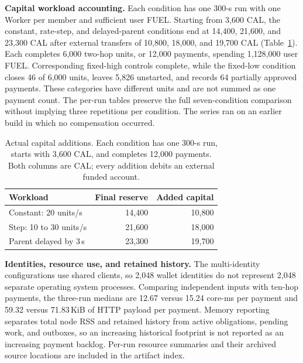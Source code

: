 \noindent\textbf{Capital workload accounting.}
Each condition has one 300-s run with one Worker per member and sufficient
user FUEL. Starting from 3,600 CAL, the constant, rate-step, and
delayed-parent conditions end at 14,400, 21,600, and 23,300 CAL after external
transfers of 10,800, 18,000, and 19,700 CAL
(Table~\ref{tab:eval-capital}). Each completes 6,000 two-hop units, or 12,000
payments, spending 1,128,000 user FUEL. Corresponding fixed-high controls
complete, while the fixed-low condition closes 46 of 6,000 units, leaves 5,826
unstarted, and records 64 partially approved payments. These categories have
different units and are not summed as one payment count. The per-run tables
preserve the full seven-condition comparison without implying three
repetitions per condition. The series ran on an earlier build in which no
compensation occurred.

\begin{table}[t]
  \caption{Actual capital additions. Each condition has one 300-s run,
    starts with 3,600 CAL, and completes 12,000 payments. Both columns
    are CAL; every addition debits an external funded account.}
  \label{tab:eval-capital}
  \centering
  \small
  \begin{tabular}{@{}lrr@{}}
    \toprule
    Workload & Final reserve & Added capital \\
    \midrule
    Constant: 20 units/s & 14,400 & 10,800 \\
    Step: 10 to 30 units/s & 21,600 & 18,000 \\
    Parent delayed by 3\,s & 23,300 & 19,700 \\
    \bottomrule
  \end{tabular}
\end{table}

\noindent\textbf{Identities, resource use, and retained history.}
The multi-identity configurations use shared clients, so 2,048 wallet
identities do not represent 2,048 separate operating system processes.
Comparing independent inputs with ten-hop payments, the three-run medians are
12.67 versus 15.24 core-ms per payment and 59.32 versus 71.83\,KiB of HTTP
payload per payment. Memory reporting separates total node RSS and retained
history from active obligations, pending work, and outboxes, so an increasing
historical footprint is not reported as an increasing payment backlog.
Per-run resource summaries and their archived source locations are included in
the artifact index.

